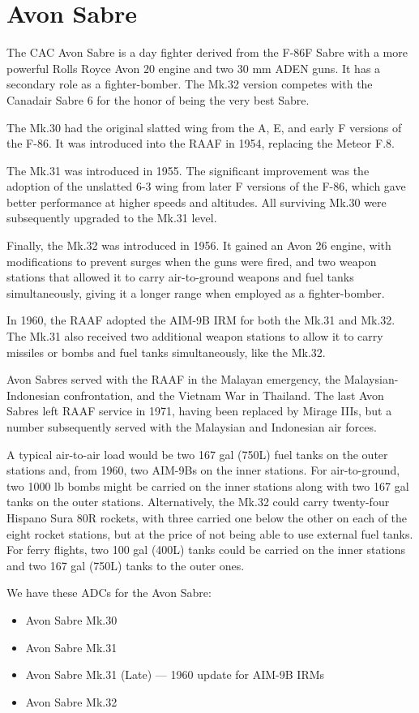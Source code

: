 \section*{Avon Sabre}

The CAC Avon Sabre is a day fighter derived from the F-86F Sabre with a more powerful Rolls Royce Avon 20 engine and two 30 mm ADEN guns. It has a secondary role as a fighter-bomber. The Mk.32 version competes with the Canadair Sabre 6 for the honor of being the very best Sabre.

The Mk.30 had the original slatted wing from the A, E, and early F versions of the F-86. It was introduced into the RAAF in 1954, replacing the Meteor F.8.

The Mk.31 was introduced in 1955. The significant improvement was the adoption of the unslatted 6-3 wing from later F versions of the F-86, which gave better performance at higher speeds and altitudes. All surviving Mk.30 were subsequently upgraded to the Mk.31 level. 

Finally, the Mk.32 was introduced in 1956. It gained an Avon 26 engine, with modifications to prevent surges when the guns were fired, and two weapon stations that allowed it to carry air-to-ground weapons and fuel tanks simultaneously, giving it a longer range when employed as a fighter-bomber.

In 1960, the RAAF adopted the AIM-9B IRM for both the Mk.31 and Mk.32. The Mk.31 also received two additional weapon stations to allow it to carry missiles or bombs and fuel tanks simultaneously, like the Mk.32.

Avon Sabres served with the RAAF in the Malayan emergency, the Malaysian-Indonesian confrontation, and the Vietnam War in Thailand. The last Avon Sabres left RAAF service in 1971, having been replaced by Mirage IIIs, but a number subsequently served with the Malaysian and Indonesian air forces.

A typical air-to-air load would be two 167 gal (750L) fuel tanks on the outer stations and, from 1960, two AIM-9Bs on the inner stations. For air-to-ground, two 1000 lb bombs might be carried on the inner stations along with two 167 gal tanks on the outer stations. Alternatively, the Mk.32 could carry twenty-four Hispano Sura 80R rockets, with three carried one below the other on each of the eight rocket stations, but at the price of not being able to use external fuel tanks. For ferry flights, two 100 gal (400L) tanks could be carried on the inner stations and two 167 gal (750L) tanks to the outer ones.

We have these ADCs for the Avon Sabre:
\begin{itemize}
\item Avon Sabre Mk.30
\item Avon Sabre Mk.31
\item Avon Sabre Mk.31 (Late) –– 1960 update for AIM-9B IRMs
\item Avon Sabre Mk.32
\end{itemize}
